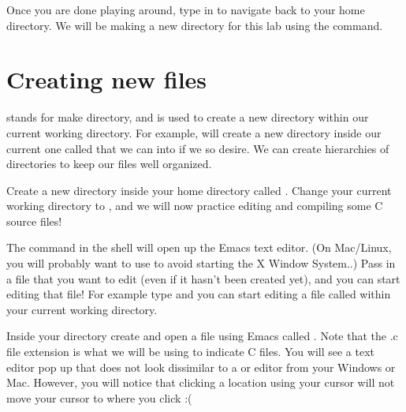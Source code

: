 \documentclass{tufte-handout}
\begin{document}
Once you are done playing around, type  in to navigate back
to your home directory. We will be making a new directory for this lab
using the  command.

\section{Creating new files}

 stands for make directory, and is used to create a new
directory within our current working directory. For example,
 will create a new directory inside our
current one called  that we can  into
if we so desire. We can create hierarchies of directories to keep our
files well organized.

Create a new directory inside your home directory called
. Change your current working directory to
, and we will now practice editing and compiling
some C source files!

The  command in the shell will open up the Emacs text%
 editor. (On Mac/Linux, you will probably want to
use  to avoid starting the X Window System..) Pass in
a file that you want to edit (even if it hasn't been created yet), and
you can start editing that file! For example type  and you can start editing a file called
 within your current working directory.

Inside your  directory create and open a file
using Emacs called . Note that the .c file
extension is what we will be using to indicate C files. You will see a
text editor pop up that does not look dissimilar to a
 or  editor from your
Windows or Mac. However, you will notice that clicking a location using
your cursor will not move your cursor to where you click :(
\end{document}
